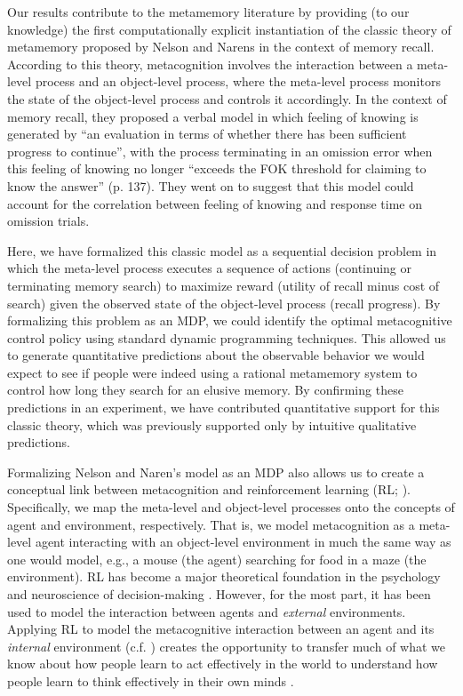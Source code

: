 Our results contribute to the metamemory literature by providing (to our knowledge) the first computationally explicit instantiation of the classic theory of metamemory proposed by Nelson and Narens \citeyearpar{nelson1990metamemory} in the context of memory recall. According to this theory, metacognition involves the interaction between a meta-level process and an object-level process, where the meta-level process monitors the state of the object-level process and controls it accordingly. In the context of memory recall, they proposed a verbal model in which feeling of knowing is generated by ``an evaluation in terms of whether there has been sufficient progress to continue'', with the process terminating in an omission error when this feeling of knowing no longer ``exceeds the FOK threshold for claiming to know the answer'' (p. 137). They went on to suggest that this model could account for the correlation between feeling of knowing and response time on omission trials.

Here, we have formalized this classic model as a sequential decision problem in which the meta-level process executes a sequence of actions (continuing or terminating memory search) to maximize reward (utility of recall minus cost of search) given the observed state of the object-level process (recall progress). By formalizing this problem as an MDP, we could identify the optimal metacognitive control policy using standard dynamic programming techniques. This allowed us to generate quantitative predictions about the observable behavior we would expect to see if people were indeed using a rational metamemory system to control how long they search for an elusive memory. By confirming these predictions in an experiment, we have contributed quantitative support for this classic theory, which was previously supported only by intuitive qualitative predictions.

Formalizing Nelson and Naren's model as an MDP also allows us to create a conceptual link between metacognition and reinforcement learning (RL; \citealp{sutton2018reinforcement}). Specifically, we map the meta-level and object-level processes onto the concepts of agent and environment, respectively. That is, we model metacognition as a meta-level agent interacting with an object-level environment in much the same way as one would model, e.g., a mouse (the agent) searching for food in a maze (the environment). RL has become a major theoretical foundation in the psychology and neuroscience of decision-making \citep{niv2009reinforcement,dayan2008decision,glimcher2011understanding}. However, for the most part, it has been used to model the interaction between agents and \emph{external} environments. Applying RL to model the metacognitive interaction between an agent and its \emph{internal} environment (c.f. \citealp{simon1955behavioral}) creates the opportunity to transfer much of what we know about how people learn to act effectively in the world to understand how people learn to think effectively in their own minds \citep{lieder2018rational}.

